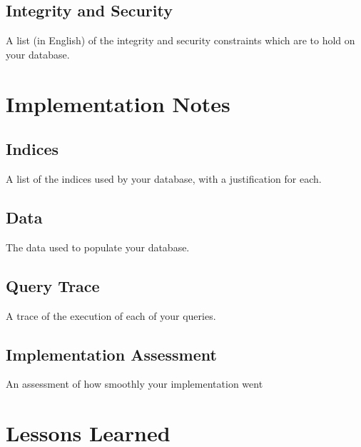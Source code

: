 \documentclass[11pt, a4paper]{report}
\begin{document}
\section{Integrity and Security}
    A list (in English) of the integrity and security constraints which are to hold on your database.

\chapter{Implementation Notes}
\section{Indices}
    A list of the indices used by your database, with a justification for each.
\section{Data}
    The data used to populate your database.
\section{Query Trace}
    A trace of the execution of each of your queries.
\section{Implementation Assessment}
    An assessment of how smoothly your implementation went

\chapter{Lessons Learned}
\end{document}

